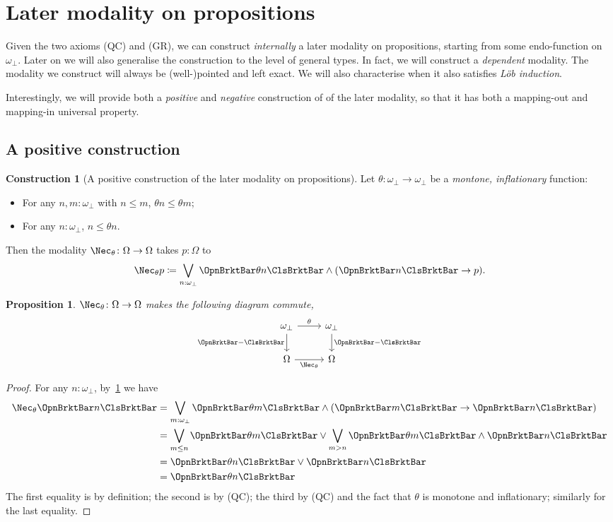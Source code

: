 \documentclass[a4paper,10pt]{amsart}
\newtheorem{proposition}{Proposition}[section]
\theoremstyle{definition}
\newtheorem{construction}{Construction}[section]
\newcommand{\ass}[1]{\OpnBrktBar#1\ClsBrktBar}
\newcommand{\ovob}{\omega_\bot}
\newcommand{\bbx}{\Nec}
\newcommand{\Prop}{\Omega}
\begin{document}
\section{Later modality on propositions}

Given the two axioms (QC) and (GR), we can construct \emph{internally} a later modality on propositions, starting from some endo-function on $\ovob$. Later on we will also generalise the construction to the level of general types. In fact, we will construct a \emph{dependent} modality. The modality we construct will always be (well-)pointed and left exact. We will also characterise when it also satisfies \emph{L\"ob induction}.

Interestingly, we will provide both a \emph{positive} and \emph{negative} construction of of the later modality, so that it has both a mapping-out and mapping-in universal property.

\subsection{A positive construction}

\begin{construction}[A positive construction of the later modality on propositions]\label{consprop}
  Let $\theta \colon \ovob \to \ovob$ be a \emph{montone, inflationary} function: 
  \begin{itemize}
    \item For any $n,m:\ovob$ with $n\le m$, $\theta n \le \theta m$;
    \item For any $n:\ovob$, $n \le \theta n$.
  \end{itemize}
  Then the modality $\bbx_\theta \colon \Prop \to \Prop$ takes $p:\Prop$ to
  \[ \bbx_\theta p \coloneq \bigvee_{n:\ovob} \ass{\theta n} \wedge (\ass n \to p). \]
\end{construction}

\begin{proposition}\label{modalityonrepre}
  $\bbx_\theta \colon \Prop \to \Prop$ makes the following diagram commute,
  \[ 
  \begin{tikzcd}
    \ovob \ar[d, "\ass-"'] \ar[r, "\theta"] & \ovob \ar[d, "\ass-"] \\
    \Prop \ar[r, "\bbx_\theta"'] & \Prop
  \end{tikzcd}
  \]
\end{proposition}
\begin{proof}
  For any $n:\ovob$, by~\cref{consprop} we have 
  \begin{align*}
    \bbx_\theta\ass n 
    &= \bigvee_{m:\ovob} \ass{\theta m} \wedge (\ass m \to \ass n) \\ 
    &= \bigvee_{m \le n} \ass{\theta m} \vee \bigvee_{m > n} \ass{\theta m} \wedge \ass n \\ 
    &= \ass{\theta n} \vee \ass n \\ 
    &= \ass{\theta n}
  \end{align*}
  The first equality is by definition; the second is by (QC); the third by (QC) and the fact that $\theta$ is monotone and inflationary; similarly for the last equality.
\end{proof}
\end{document}
